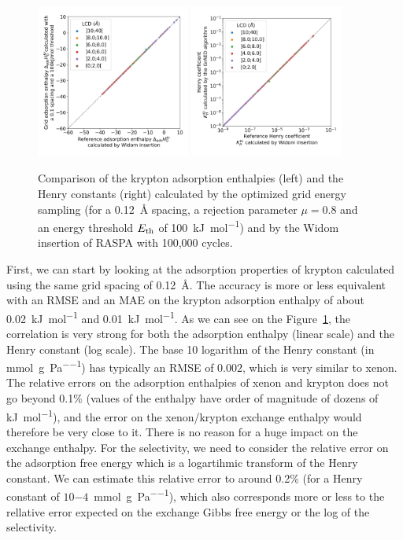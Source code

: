 \documentclass[main]{subfiles}
\begin{document}
\begin{figure}[ht]
  \centering
    \includegraphics[width=0.45\textwidth]{figures/3-fastsim/H_Kr_0_widom_vs_H_Kr_grid_overview.jpg}
    \includegraphics[width=0.45\textwidth]{figures/3-fastsim/K_Kr_widom_vs_K_Kr_grid_overview.jpg}
    \caption{Comparison of the krypton adsorption enthalpies (left) and the Henry constants (right) calculated by the optimized grid energy sampling (for a \SI{0.12}{\angstrom} spacing, a rejection parameter $\mu=0.8$ and an energy threshold $E_{\text{th}}$ of \SI{100}{\kilo\joule\per\mole}) and by the Widom insertion of RASPA with 100,000 cycles. }\label{fgr:grid_widom_kr}
\end{figure}

First, we can start by looking at the adsorption properties of krypton calculated using the same grid spacing of \SI{0.12}{\angstrom}. The accuracy is more or less equivalent with an RMSE and an MAE on the krypton adsorption enthalpy of about \SI{0.02}{\kilo\joule\per\mole} and \SI{0.01}{\kilo\joule\per\mole}. As we can see on the Figure~\ref{fgr:grid_widom_kr}, the correlation is very strong for both the adsorption enthalpy (linear scale) and the Henry constant (log scale). The base 10 logarithm of the Henry constant (in \si{\milli\mole\per\gram\per\pascal}) has typically an RMSE of $0.002$, which is very similar to xenon. The relative errors on the adsorption enthalpies of xenon and krypton does not go beyond {0.1\%} (values of the enthalpy have order of magnitude of dozens of \si{\kilo\joule\per\mole}), and the error on the xenon/krypton exchange enthalpy would therefore be very close to it. There is no reason for a huge impact on the exchange enthalpy. For the selectivity, we need to consider the relative error on the adsorption free energy which is a logartihmic transform of the Henry constant. We can estimate this relative error to around {0.2\%} (for a Henry constant of $10{-4}$~\si{\milli\mole\per\gram\per\pascal}), which also corresponds more or less to the rellative error expected on the exchange Gibbs free energy or the log of the selectivity.
\end{document}
